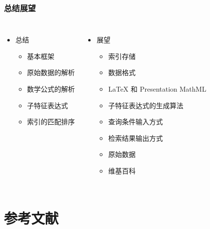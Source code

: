 \documentclass[17pt]{beamer}
\begin{document}
    \begin{frame}
        \frametitle{总结展望}
        \vspace{-3cm}
        \begin{columns}
                \begin{itemize}
                    \item 总结
                    \begin{itemize}
                        \item 基本框架
                        \item 原始数据的解析
                        \item 数学公式的解析
                        \item[] 子特征表达式
                        \item 索引的匹配排序
                    \end{itemize}
                \end{itemize}

            \pause

                \begin{itemize}
                    \item 展望
                    \begin{itemize}
                        \item 索引存储
                        \item 数据格式
                        \item[] LaTeX 和 Presentation MathML
                        \item 子特征表达式的生成算法
                        \item 查询条件输入方式
                        \item 检索结果输出方式
                        \item 原始数据
                        \item[] 维基百科
                    \end{itemize}
                \end{itemize}
        \end{columns}
    \end{frame}
    
    \section{参考文献}
    
\end{document}
